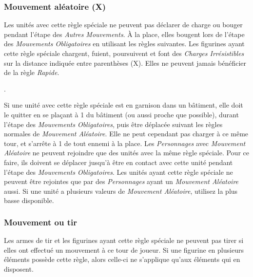 \subsubsection*{Mouvement aléatoire (X)}

Les unités avec cette règle spéciale ne peuvent pas déclarer de charge ou bouger pendant l'étape des \emph{Autres Mouvements}. À la place, elles bougent lors de l'étape des \emph{Mouvements Obligatoires} en utilisant les règles suivantes. Les figurines ayant cette règle spéciale chargent, fuient, poursuivent et font des \emph{Charges Irrésistibles} sur la distance indiquée entre parenthèses (X). Elles ne peuvent jamais bénéficier de la règle \emph{Rapide}.

. 

Si une unité avec cette règle spéciale est en garnison dans un bâtiment, elle doit le quitter en se plaçant à \unit{1}{\pouce} du bâtiment (ou aussi proche que possible), durant l'étape des \emph{Mouvements Obligatoires}, puis être déplacée suivant les règles normales de \emph{Mouvement Aléatoire}. Elle ne peut cependant pas charger à ce même tour, et s'arrête à \unit{1}{\pouce} de tout ennemi à la place. Les \emph{Personnages} avec \emph{Mouvement Aléatoire} ne peuvent rejoindre que des unités avec la même règle spéciale. Pour ce faire, ils doivent se déplacer jusqu'à être en contact avec cette unité pendant l'étape des \emph{Mouvements Obligatoires}. Les unités ayant cette règle spéciale ne peuvent être rejointes que par des \emph{Personnages} ayant un \emph{Mouvement Aléatoire} aussi. Si une unité a plusieurs valeurs de \emph{Mouvement Aléatoire}, utilisez la plus basse disponible.

\subsubsection*{Mouvement ou tir}

Les armes de tir et les figurines ayant cette règle spéciale ne peuvent pas tirer si elles ont effectué un mouvement à ce tour de joueur. Si une figurine en plusieurs éléments possède cette règle, alors celle-ci ne s'applique qu'aux éléments qui en disposent.

